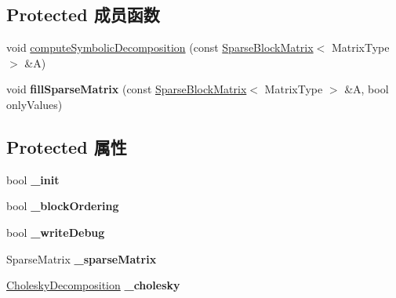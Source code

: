 \subsection*{Protected 成员函数}
\begin{DoxyCompactItemize}
\item 
void \hyperlink{classg2o_1_1LinearSolverEigen_a12307526d419d194620e982d8c683767}{compute\-Symbolic\-Decomposition} (const \hyperlink{classg2o_1_1SparseBlockMatrix}{Sparse\-Block\-Matrix}$<$ Matrix\-Type $>$ \&A)
\item 
\hypertarget{classg2o_1_1LinearSolverEigen_a8ab862dc1eebb6ec5815f3970e9073f3}{void {\bfseries fill\-Sparse\-Matrix} (const \hyperlink{classg2o_1_1SparseBlockMatrix}{Sparse\-Block\-Matrix}$<$ Matrix\-Type $>$ \&A, bool only\-Values)}\label{classg2o_1_1LinearSolverEigen_a8ab862dc1eebb6ec5815f3970e9073f3}

\end{DoxyCompactItemize}
\subsection*{Protected 属性}
\begin{DoxyCompactItemize}
\item 
\hypertarget{classg2o_1_1LinearSolverEigen_a52c02e9b24e4f6ade190e6adb29b05b4}{bool {\bfseries \-\_\-init}}\label{classg2o_1_1LinearSolverEigen_a52c02e9b24e4f6ade190e6adb29b05b4}

\item 
\hypertarget{classg2o_1_1LinearSolverEigen_a041970f37a5a6e63778f0c40e7c6e948}{bool {\bfseries \-\_\-block\-Ordering}}\label{classg2o_1_1LinearSolverEigen_a041970f37a5a6e63778f0c40e7c6e948}

\item 
\hypertarget{classg2o_1_1LinearSolverEigen_a2d331575853451fc94ca6f6420f0bdcb}{bool {\bfseries \-\_\-write\-Debug}}\label{classg2o_1_1LinearSolverEigen_a2d331575853451fc94ca6f6420f0bdcb}

\item 
\hypertarget{classg2o_1_1LinearSolverEigen_a39682995a9cf32dc79848281c6d4d9b9}{Sparse\-Matrix {\bfseries \-\_\-sparse\-Matrix}}\label{classg2o_1_1LinearSolverEigen_a39682995a9cf32dc79848281c6d4d9b9}

\item 
\hypertarget{classg2o_1_1LinearSolverEigen_ab7205de4c6820b3ecd7ed7f39bbdf573}{\hyperlink{classg2o_1_1LinearSolverEigen_1_1CholeskyDecomposition}{Cholesky\-Decomposition} {\bfseries \-\_\-cholesky}}\label{classg2o_1_1LinearSolverEigen_ab7205de4c6820b3ecd7ed7f39bbdf573}

\end{DoxyCompactItemize}


